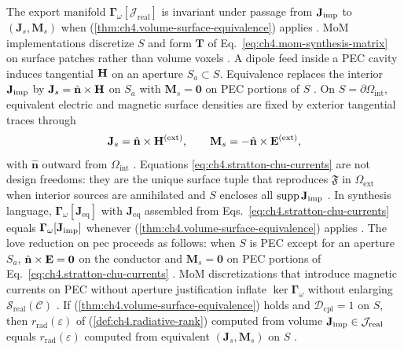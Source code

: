 The export manifold \(\boldsymbol{\Gamma}_\omega[\mathcal{J}_{\mathrm{real}}]\) is invariant under passage from \(\mathbf{J}_{\mathrm{imp}}\) to
\((\mathbf{J}_{s},\mathbf{M}_{s})\) when (\ref{thm:ch4.volume-surface-equivalence}) applies
\cite{devaney2004}. MoM implementations discretize \(S\) and form \(\mathbf{T}\) of
Eq.~\eqref{eq:ch4.mom-synthesis-matrix} on surface patches rather than volume voxels
\cite{harrington2001}.
A dipole feed inside a PEC cavity induces tangential \(\mathbf{H}\) on an aperture \(S_{a}\subset S\).
Equivalence replaces the interior \(\mathbf{J}_{\mathrm{imp}}\) by \(\mathbf{J}_{s}=\hat{\mathbf{n}}\times\mathbf{H}\) on \(S_{a}\) with
\(\mathbf{M}_{s}=\mathbf{0}\) on PEC portions of \(S\) \cite{stratton1941}.
On \(S=\partial\Omega_{\mathrm{int}}\), equivalent electric and magnetic surface densities are fixed by exterior
tangential traces through
\begin{equation}
\mathbf{J}_{s}
=
\hat{\mathbf{n}}\times\mathbf{H}^{\mathrm{(ext)}},
\qquad
\mathbf{M}_{s}
=
-\hat{\mathbf{n}}\times\mathbf{E}^{\mathrm{(ext)}},
\end{equation}
with \(\hat{\mathbf{n}}\) outward from \(\Omega_{\mathrm{int}}\) \cite{stratton1941}. Equations
\eqref{eq:ch4.stratton-chu-currents} are not design freedoms: they are the unique surface tuple that reproduces
\(\mathfrak{F}\) in \(\Omega_{\mathrm{ext}}\) when interior sources are annihilated and \(S\) encloses all
\(\operatorname{supp}\mathbf{J}_{\mathrm{imp}}\) \cite{collin2001}. In synthesis language,
\(\boldsymbol{\Gamma}_\omega[\mathbf{J}_{\mathrm{eq}}]\) with \(\mathbf{J}_{\mathrm{eq}}\) assembled from
Eqs.~\eqref{eq:ch4.stratton-chu-currents} equals \(\boldsymbol{\Gamma}_\omega[\mathbf{J}_{\mathrm{imp}}]\) whenever
(\ref{thm:ch4.volume-surface-equivalence}) applies \cite{stratton1941}.
The love reduction on pec proceeds as follows: when \(S\) is PEC except for an aperture \(S_{a}\), \(\hat{\mathbf{n}}\times\mathbf{E}=\mathbf{0}\) on the conductor and
\(\mathbf{M}_{s}=\mathbf{0}\) on PEC portions of Eq.~\eqref{eq:ch4.stratton-chu-currents}
\cite{stratton1941}. MoM discretizations that introduce magnetic currents on PEC without aperture justification
inflate \(\ker\boldsymbol{\Gamma}_\omega\) without enlarging \(\mathcal{S}_{\mathrm{real}}(\mathcal{C})\)
\cite{devaney2004}.
\label{cor:ch4.equivalence-rank-invariance}
If (\ref{thm:ch4.volume-surface-equivalence}) holds and \(\mathcal{D}_{\mathrm{cpl}}=1\) on \(S\), then
\(r_{\mathrm{rad}}(\varepsilon)\) of (\ref{def:ch4.radiative-rank}) computed from volume
\(\mathbf{J}_{\mathrm{imp}}\in\mathcal{J}_{\mathrm{real}}\) equals \(r_{\mathrm{rad}}(\varepsilon)\) computed from equivalent
\((\mathbf{J}_{s},\mathbf{M}_{s})\) on \(S\) \cite{stratton1941}.
